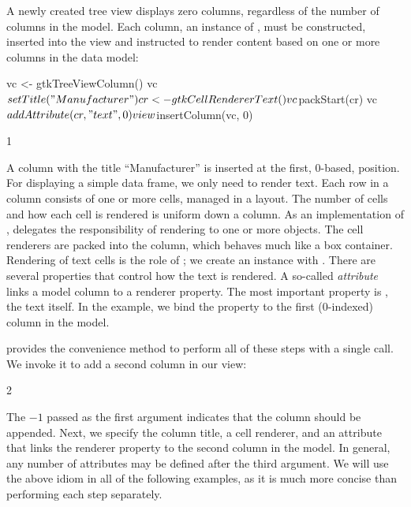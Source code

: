 A newly created tree view displays zero columns, regardless of the
number of columns in the model. Each column, an instance of
, must be constructed, inserted into the view and
instructed to render content based on one or more columns in the data
model:
\begin{Schunk}
\begin{Sinput}
 vc <- gtkTreeViewColumn()
 vc$setTitle("Manufacturer")
 cr <- gtkCellRendererText()
 vc$packStart(cr)
 vc$addAttribute(cr, "text", 0)
 view$insertColumn(vc, 0)
\end{Sinput}
\begin{Soutput}
[1] 1
\end{Soutput}
\end{Schunk}
%
A column with
the title ``Manufacturer'' is inserted at the first, $0$-based,
position. For displaying a simple data frame, we only need to render
text. Each row in a column consists of one or more cells, managed in a
layout. The number of cells and how each cell is rendered is uniform
down a column. As an implementation of ,
 delegates the responsibility of rendering to
one or more  objects. The cell renderers are
packed into the column, which behaves much like a box
container. Rendering of text cells is the role of
; we create an instance with
. There are several properties that
control how the text is rendered. A so-called \textit{attribute} links
a model column to a renderer property. The most important property is
, the text itself. In the example, we bind the 
property to the first ($0$-indexed) column in the model.

 provides the 
convenience method to perform all of these steps with a single
call. We invoke it to add a second column in our view:
\begin{Schunk}
\begin{Soutput}
[1] 2
\end{Soutput}
\end{Schunk}
% 
The $-1$ passed as the first argument indicates that the column should
be appended. Next, we specify the column title, a cell renderer, and
an attribute that links the  renderer property to the
second column in the model. In general, any number of attributes may
be defined after the third argument.  We will use the above idiom in
all of the following examples, as it is much more concise than
performing each step separately.

